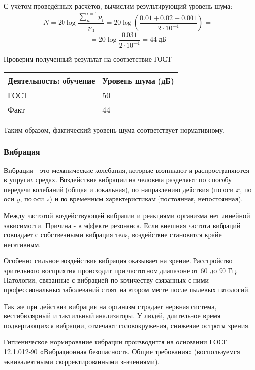 С учётом проведённых расчётов, вычислим результирующий уровень шу\-ма:
$$
N = 20 \log \frac{\sum\limits_{n}^{i=1}p_i}{p_0} =  20 \log \left(\frac{0.01 + 0.02 + 0.001}{2 \cdot 10^{-4}}\right) = 
$$
$$
=  20 \log \frac{0.031}{2 \cdot 10^{-4}} = 44 \mbox{ дБ}
$$

Проверим полученный результат на соответствие ГОСТ

\begin{table}[H]
\begin{center}
\begin{tabular}{|p{4cm}|p{3cm}|}
\hline
Деятельность: обучение & Уровень шума (дБ)  \\
\hline
ГОСТ & 50  \\
\hline
Факт & 44  \\
\hline
\end{tabular}
\end{center}
\end{table}

Таким образом, фактический уровень шума соответствует нормативному.

\subsubsection{Вибрация}

Вибрации - это механические колебания, которые возникают и распро\-страняются в упругих средах. Воздействие вибрации на человека разделяют по способу передачи коле\-баний (общая и локальная), по направлению действия (по оси $x$, по оси $y$, по оси $z$) и по временным характеристикам (постоянная, непостоянная).

Между частотой воздействующей вибрации и реакциями организма нет линейной зави\-симости. Причина - в эффекте резонанса. Если внешняя частота вибраций совпадает с собственными вибрация тела, воздействие становится крайе негативным.

Особенно сильное воздействие вибрация оказывает на зрение. Расстройство зрительного восприятия происходит при частотном диапазоне от $60$ до $90$ Гц. Патологии, связанные с вибрацией по количеству связанных с ними профес\-сиональных заболеваний стоят на втором месте после пылевых патологий.

Так же при действии вибрации на организм страдает нервная система, вестибюлярный и тактильный анализаторы. У людей, длительное время под\-вергающихся вибрации, отме\-чают головокружения, снижение остроты зрения.

Гигиеническое нормирование вибрации производится на основании ГОСТ 12.1.012-90 «Вибрационная безопасность. Общие требования» (воспользуемся эквивалентными скор\-ректированными значениями).


